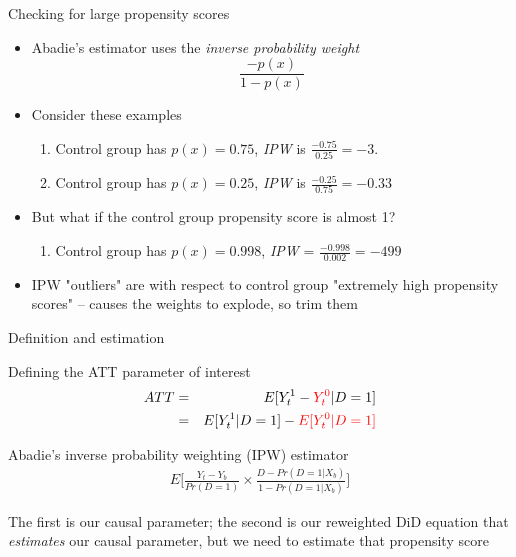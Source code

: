 \documentclass{beamer}
\begin{document}
\begin{frame}{Checking for large propensity scores}

\begin{itemize}
\item Abadie's estimator uses the \emph{inverse probability weight} $$\frac{-p(x)}{1-p(x)}$$
\item Consider these examples
	\begin{enumerate}
	\item Control group has $p(x)=0.75$, \emph{IPW} is $\frac{-0.75}{0.25}=-3$. 
	\item Control group has $p(x)=0.25$, \emph{IPW} is $\frac{-0.25}{0.75}=-0.33$
	\end{enumerate}
\item But what if the control group propensity score is almost 1?
	\begin{enumerate}
	\item Control group has $p(x)=0.998$, \emph{IPW} = $\frac{-0.998}{0.002}=-499$
	\end{enumerate}
\item IPW "outliers" are with respect to control group "extremely high propensity scores" -- causes the weights to explode, so trim them
\end{itemize}

\end{frame}


\begin{frame}{Definition and estimation}

Defining the ATT parameter of interest
\begin{eqnarray*}
ATT &=& E[Y^1_t - \textcolor{red}{Y^0_t} |D=1] \\
&=&E[Y^1_t  | D = 1 ] - \textcolor{red}{E[Y^0_t | D=1]}
\end{eqnarray*}

\bigskip
Abadie's inverse probability weighting (IPW) estimator
\begin{eqnarray*}
E\bigg [ \frac{Y_t - Y_b}{Pr(D=1)} \times \frac{D - Pr(D=1|X_b)}{1-Pr(D=1|X_b)} \bigg ]
\end{eqnarray*}

\bigskip

The first is our causal parameter; the second is our reweighted DiD equation that \emph{estimates} our causal parameter, but we need to estimate that propensity score


\end{frame}
\end{document}
